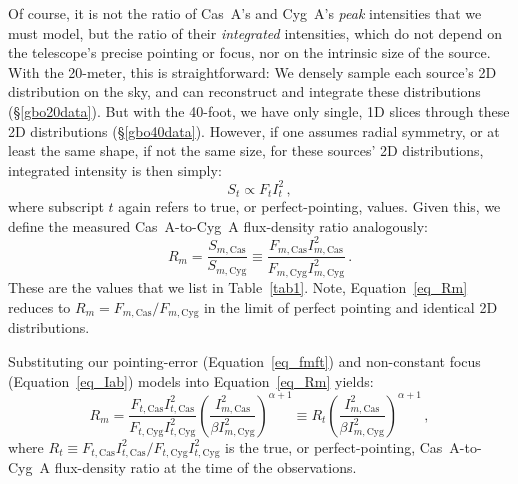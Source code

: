 \documentclass[fleqn,usenatbib]{mnras}
\newcommand{\Imcyg}{\mbox{$I^2_{m,\mathrm{Cyg}}$}}
\newcommand{\Itcyg}{\mbox{$I^2_{t,\mathrm{Cyg}}$}}
\newcommand{\Imcas}{\mbox{$I^2_{m,\mathrm{Cas}}$}}
\newcommand{\Itcas}{\mbox{$I^2_{t,\mathrm{Cas}}$}}
\newcommand{\Fmcyg}{\mbox{$F_{m, \mathrm{Cyg}}$}}
\newcommand{\Fmcas}{\mbox{$F_{m, \mathrm{Cas}}$}}
\newcommand{\Ftcyg}{\mbox{$F_{t, \mathrm{Cyg}}$}}
\newcommand{\Ftcas}{\mbox{$F_{t, \mathrm{Cas}}$}}
\begin{document}
Of course, it is not the ratio of Cas~A's and Cyg~A's \textit{peak} intensities that we must model, but the ratio of their \textit{integrated} intensities, which do not depend on the telescope's precise pointing or focus, nor on the intrinsic size of the source.  With the 20-meter, this is straightforward:  We densely sample each source's 2D distribution on the sky, and can reconstruct and integrate these distributions (\S\ref{gbo20data}).  But with the 40-foot, we have only single, 1D slices through these 2D distributions (\S\ref{gbo40data}).  However, if one assumes radial symmetry, or at least the same shape, if not the same size, for these sources' 2D distributions, integrated intensity is then simply:
\begin{equation}
S_t \propto F_tI_t^2 \, ,
\end{equation}
\noindent
where subscript $t$ again refers to true, or perfect-pointing, values.  Given this, we define the measured Cas~A-to-Cyg~A flux-density ratio analogously:
\begin{equation}\label{eq_Rm}
R_m = \frac{S_{m,\mathrm{Cas}}}{S_{m,\mathrm{Cyg}}} \equiv \frac{\Fmcas\Imcas}{\Fmcyg\Imcyg} \, .
\end{equation}
\noindent These are the values that we list in Table~\ref{tab1}.  Note, Equation~\ref{eq_Rm} reduces to $R_m = F_{m,\mathrm{Cas}}/F_{m,\mathrm{Cyg}}$ in the limit of perfect pointing and identical 2D distributions.  
 
Substituting our pointing-error (Equation~\ref{eq_fmft}) and non-constant focus (Equation~\ref{eq_Iab}) models into Equation~\ref{eq_Rm} yields:
\begin{equation}\label{eq_meh1}
R_m = \frac{\Ftcas\Itcas}{\Ftcyg\Itcyg}\left(\frac{\Imcas}{\beta\Imcyg}\right)^{\alpha+1} 
    \equiv R_t\left(\frac{\Imcas}{\beta\Imcyg}\right)^{\alpha+1} \, ,
\end{equation}
where $R_t\equiv\Ftcas\Itcas/\Ftcyg\Itcyg$ is the true, or perfect-pointing, Cas~A-to-Cyg~A flux-density ratio at the time of the observations.
\end{document}
